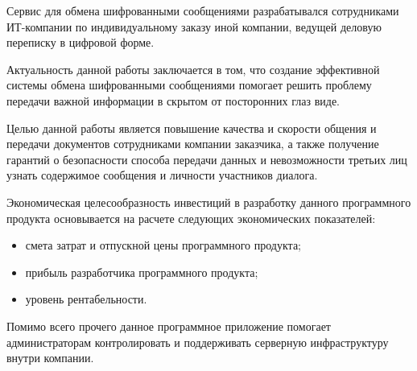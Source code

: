 Сервис для обмена шифрованными сообщениями разрабатывался сотрудниками ИТ-компании по индивидуальному заказу иной компании, ведущей деловую переписку в цифровой форме.

Актуальность данной работы заключается в том, что создание эффективной системы обмена шифрованными сообщениями помогает решить проблему передачи важной информации в скрытом от посторонних глаз виде.

Целью данной работы является повышение качества и скорости общения и передачи документов сотрудниками компании заказчика, а также получение гарантий о безопасности способа передачи данных и невозможности третьих лиц узнать содержимое сообщения и личности участников диалога.

Экономическая целесообразность инвестиций в разработку данного программного продукта основывается на расчете следующих экономических показателей:
\begin{itemize}
    \item смета затрат и отпускной цены программного продукта;
    \item прибыль разработчика программного продукта;
    \item уровень рентабельности.
\end{itemize}

Помимо всего прочего данное программное приложение помогает администраторам контролировать и поддерживать серверную инфраструктуру внутри компании.